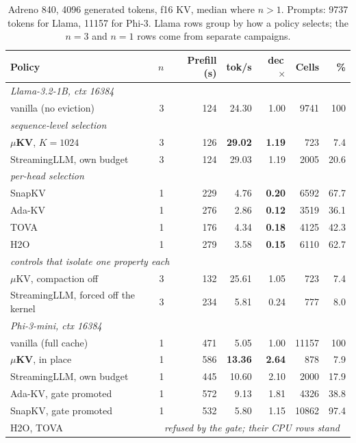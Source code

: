 \documentclass[sigconf, anonymous=false, screen=true]{acmart}
\newcommand{\good}[1]{\textcolor{kvgreen}{\textbf{#1}}}
\newcommand{\bad}[1]{\textcolor{kvred}{\textbf{#1}}}
\newcommand{\muKV}{$\mu$KV}
\begin{document}
\begin{table}[tb]
\caption{Adreno 840, 4096 generated tokens, f16 KV, median where $n>1$. Prompts: 9737 tokens for Llama, 11157 for Phi-3. Llama rows group by how a policy selects; the $n{=}3$ and $n{=}1$ rows come from separate campaigns.}
\label{tab:gpu}
\centering\footnotesize
\setlength{\tabcolsep}{3.5pt}
\begin{tabular}{l r r r r r r}
\toprule
\textbf{Policy} & \textbf{$n$} & \textbf{Prefill (s)} & \textbf{tok/s} & \textbf{dec\,$\times$} & \textbf{Cells} & \textbf{\%} \\
\midrule
\multicolumn{7}{l}{\emph{Llama-3.2-1B, ctx 16384}} \\
vanilla (no eviction) & 3 & 124 & 24.30 & 1.00 & 9741 & 100 \\
\multicolumn{7}{l}{\quad\emph{sequence-level selection}} \\
\textbf{\muKV}, $K{=}1024$ & 3 & 126 & \good{29.02} & \good{1.19} & 723 & 7.4 \\
StreamingLLM, own budget & 3 & 124 & 29.03 & 1.19 & 2005 & 20.6 \\
\multicolumn{7}{l}{\quad\emph{per-head selection}} \\
SnapKV               & 1 & 229 & 4.76 & \bad{0.20} & 6592 & 67.7 \\
Ada-KV               & 1 & 276 & 2.86 & \bad{0.12} & 3519 & 36.1 \\
TOVA                 & 1 & 176 & 4.34 & \bad{0.18} & 4125 & 42.3 \\
H2O                  & 1 & 279 & 3.58 & \bad{0.15} & 6110 & 62.7 \\
\multicolumn{7}{l}{\quad\emph{controls that isolate one property each}} \\
\muKV, compaction off & 3 & 132 & 25.61 & 1.05 & 723 & 7.4 \\
StreamingLLM, forced off the kernel & 3 & 234 & 5.81 & 0.24 & 777 & 8.0 \\
\midrule
\multicolumn{7}{l}{\emph{Phi-3-mini, ctx 16384}} \\
vanilla (full cache)     & 1 & 471 & 5.05 & 1.00 & 11157 & 100 \\
\textbf{\muKV}, in place & 1 & 586 & \good{13.36} & \good{2.64} & 878 & 7.9 \\
StreamingLLM, own budget & 1 & 445 & 10.60 & 2.10 & 2000 & 17.9 \\
Ada-KV, gate promoted    & 1 & 572 & 9.13 & 1.81 & 4326 & 38.8 \\
SnapKV, gate promoted    & 1 & 532 & 5.80 & 1.15 & 10862 & 97.4 \\
H2O, TOVA & \multicolumn{6}{c}{\emph{refused by the gate; their CPU rows stand}} \\
\bottomrule
\end{tabular}
\end{table}
\end{document}
